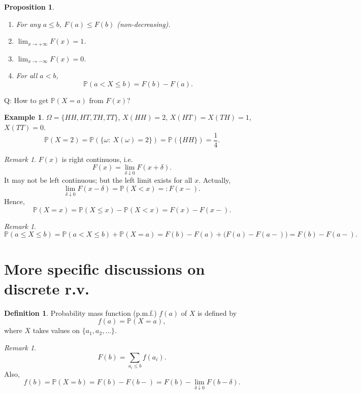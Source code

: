\documentclass[11pt]{article}
\theoremstyle{plain}
\newtheorem{proposition}[theorem]{Proposition}
\theoremstyle{definition}
\newtheorem{definition}[theorem]{Definition}
\newtheorem{example}[theorem]{Example}
\theoremstyle{remark}
\newtheorem{remark}[theorem]{Remark}
\begin{document}
	\begin{proposition}
		\begin{enumerate}
			\item [(i)] For any \(a\le b\), \(F(a)\le F(b)\) (non-decreasing).
			\item [(ii)] \(\displaystyle \lim_{x\to +\infty}F(x)=1\).
			\item [(iii)] \(\displaystyle \lim_{x\to -\infty}F(x)=0\).
			\item [(iv)] For all \(a<b\),
			\[
			\mathbb{P}(a<X\le b)=F(b)-F(a).
			\]
		\end{enumerate}
	\end{proposition}
	
	Q: How to get \(\mathbb{P}(X=a)\) from \(F(x)\)?
	
	\begin{example}
		\(\Omega=\{HH,HT,TH,TT\}\),
		\(X(HH)=2\), \(X(HT)=X(TH)=1\), \(X(TT)=0\).
		\[
		\mathbb{P}(X=2)=\mathbb{P}(\{\omega:\ X(\omega)=2\})=\mathbb{P}(\{HH\})=\frac14.
		\]
	\end{example}
	
	\begin{remark}
		\(F(x)\) is right continuous, i.e.
		\[
		F(x)=\lim_{\delta\downarrow 0}F(x+\delta).
		\]
		It may not be left continuous; but the left limit exists for all \(x\).
		Actually,
		\[
		\lim_{\delta\downarrow 0}F(x-\delta)=\mathbb{P}(X<x)=:F(x-).
		\]
		Hence,
		\[
		\mathbb{P}(X=x)=\mathbb{P}(X\le x)-\mathbb{P}(X<x)=F(x)-F(x-).
		\]
	\end{remark}
	
	\begin{remark}
		\[
		\mathbb{P}(a\le X\le b)
		=\mathbb{P}(a<X\le b)+\mathbb{P}(X=a)
		=F(b)-F(a)+\big(F(a)-F(a-)\big)
		=F(b)-F(a-).
		\]
	\end{remark}
	
	\section{More specific discussions on discrete r.v.}
	
	\begin{definition}
		Probability mass function (p.m.f.) \(f(a)\) of \(X\) is defined by
		\[
		f(a)=\mathbb{P}(X=a),
		\]
		where \(X\) takes values on \(\{a_1,a_2,\dots\}\).
	\end{definition}
	
	\begin{remark}
		\[
		F(b)=\sum_{a_i\le b} f(a_i).
		\]
		Also,
		\[
		f(b)=\mathbb{P}(X=b)=F(b)-F(b-)=F(b)-\lim_{\delta\downarrow 0}F(b-\delta).
		\]
	\end{remark}
	
\end{document}
